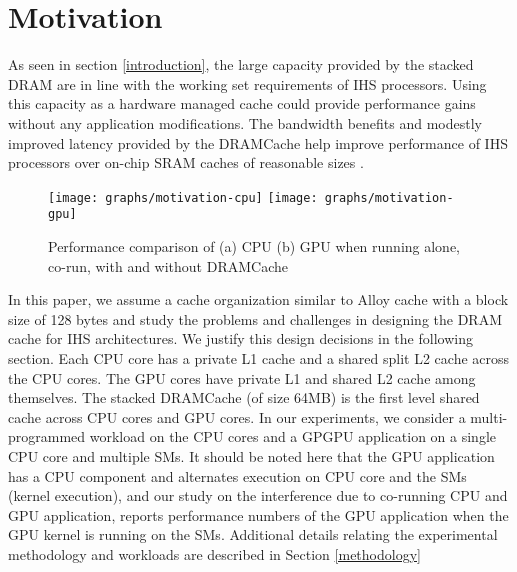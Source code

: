 \section{Motivation} \label{motivation}
As seen in section \ref{introduction}, the large capacity provided by the stacked DRAM are in line with the working set requirements of IHS processors. Using this capacity as a hardware managed cache could provide performance gains without any application modifications. The bandwidth benefits and modestly improved latency provided by the DRAMCache help improve performance of IHS processors over on-chip SRAM caches of reasonable sizes \cite{amd-exascale1}. 
\begin{figure}[htbp]
   \texttt{[image: graphs/motivation-cpu]}
   \texttt{[image: graphs/motivation-gpu]}
   \caption{Performance comparison of (a) CPU (b) GPU when running alone, co-run, with and without DRAMCache}
   \label{fig:motivation}
\end{figure}
\par In this paper, we assume a cache organization similar to Alloy cache \cite{alloy} with a block size of 128 bytes and study the problems and challenges in designing the DRAM cache for IHS architectures. We justify this design decisions in the following section. 
Each CPU core has a private L1 cache and a shared split L2 cache across the CPU cores. The GPU cores have private L1 and shared L2 cache among themselves.  
The stacked DRAMCache (of size 64MB) is the first level shared cache across CPU cores and GPU cores. In our experiments, we consider a multi-programmed workload on the CPU cores and a GPGPU application on a single CPU core and multiple SMs. It should be noted here that the GPU application has a CPU component and alternates execution on CPU core and the SMs (kernel execution), and our study on the interference due to co-running CPU and GPU application, reports performance numbers of the GPU application when the GPU kernel is running on the SMs.  
Additional details relating the experimental methodology and workloads are described in Section \ref{methodology}


